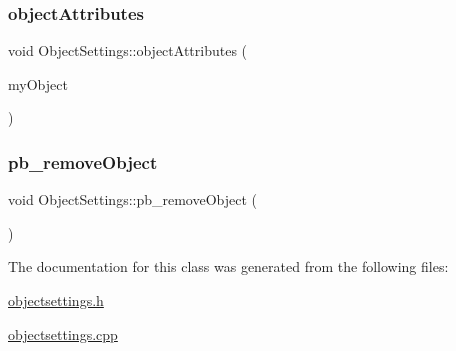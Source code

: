 \mbox{\label{class_object_settings_a47aec256bb36db5eda17686a38294932}} 
\subsubsection{\texorpdfstring{object\+Attributes}{objectAttributes}}
{\footnotesize\ttfamily void Object\+Settings\+::object\+Attributes (\begin{DoxyParamCaption}\item[{\hyperlink{class_graphics_object}{Graphics\+Object} $\ast$}]{my\+Object }\end{DoxyParamCaption})\hspace{0.3cm}{\ttfamily [slot]}}

\mbox{\label{class_object_settings_a748b6c75fd1d8a63314f1ebd585c51ce}} 
\subsubsection{\texorpdfstring{pb\+\_\+remove\+Object}{pb\_removeObject}}
{\footnotesize\ttfamily void Object\+Settings\+::pb\+\_\+remove\+Object (\begin{DoxyParamCaption}{ }\end{DoxyParamCaption})\hspace{0.3cm}{\ttfamily [signal]}}



The documentation for this class was generated from the following files\+:\begin{DoxyCompactItemize}
\item 
\hyperlink{objectsettings_8h}{objectsettings.\+h}\item 
\hyperlink{objectsettings_8cpp}{objectsettings.\+cpp}\end{DoxyCompactItemize}
